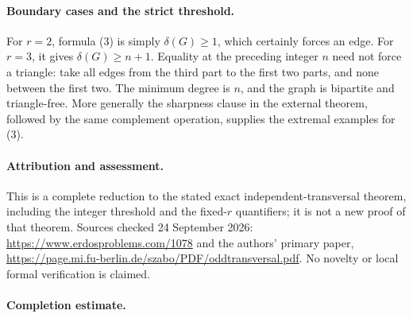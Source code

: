 \paragraph{Boundary cases and the strict threshold.}
For \(r=2\), formula (3) is simply \(\delta(G)\geq1\), which certainly forces an edge. For \(r=3\), it gives \(\delta(G)\geq n+1\). Equality at the preceding integer \(n\) need not force a triangle: take all edges from the third part to the first two parts, and none between the first two. The minimum degree is \(n\), and the graph is bipartite and triangle-free. More generally the sharpness clause in the external theorem, followed by the same complement operation, supplies the extremal examples for (3).

\paragraph{Attribution and assessment.}
This is a complete reduction to the stated exact independent-transversal theorem, including the integer threshold and the fixed-\(r\) quantifiers; it is not a new proof of that theorem. Sources checked 24 September 2026: \url{https://www.erdosproblems.com/1078} and the authors' primary paper, \url{https://page.mi.fu-berlin.de/szabo/PDF/oddtransversal.pdf}. No novelty or local formal verification is claimed.

\paragraph{Completion estimate.}
